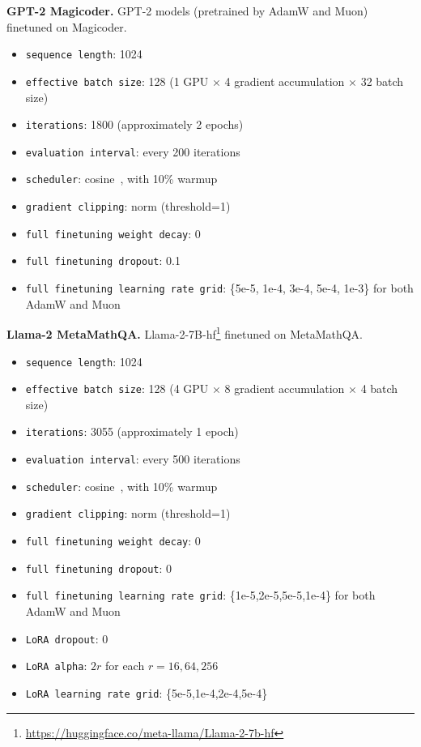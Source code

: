 \documentclass{article}
\theoremstyle{remark}
\begin{document}
\textbf{GPT-2 Magicoder.} GPT-2 models (pretrained by AdamW and Muon) finetuned on Magicoder.
\begin{itemize}
    \item \texttt{sequence length}: 1024
    \item \texttt{effective batch size}: 128 (1 GPU $\times$ 4 gradient accumulation $\times$ 32 batch size)
    \item \texttt{iterations}: 1800 (approximately 2 epochs)
    \item \texttt{evaluation interval}: every 200 iterations
    \item \texttt{scheduler}: cosine~\citep{loshchilov2016sgdr}, with 10\% warmup
    \item \texttt{gradient clipping}: norm (threshold=1)
    \item \texttt{full finetuning weight decay}: 0
    \item \texttt{full finetuning dropout}: 0.1
    \item \texttt{full finetuning learning rate grid}: \{5e-5, 1e-4, 3e-4, 5e-4, 1e-3\} for both AdamW and Muon
\end{itemize}

\textbf{Llama-2 MetaMathQA.} Llama-2-7B-hf\footnote{\url{https://huggingface.co/meta-llama/Llama-2-7b-hf}} finetuned on MetaMathQA.
\begin{itemize}
    \item \texttt{sequence length}: 1024
    \item \texttt{effective batch size}: 128 (4 GPU $\times$ 8 gradient accumulation $\times$ 4 batch size)
    \item \texttt{iterations}: 3055 (approximately 1 epoch)
    \item \texttt{evaluation interval}: every 500 iterations
    \item \texttt{scheduler}: cosine~\citep{loshchilov2016sgdr}, with 10\% warmup
    \item \texttt{gradient clipping}: norm (threshold=1)
    \item \texttt{full finetuning weight decay}: 0
    \item \texttt{full finetuning dropout}: 0
    \item \texttt{full finetuning learning rate grid}: \{1e-5,2e-5,5e-5,1e-4\} for both AdamW and Muon
    \item \texttt{LoRA dropout}: 0
    \item \texttt{LoRA alpha}: $2r$ for each $r=16,64,256$
    \item \texttt{LoRA learning rate grid}: \{5e-5,1e-4,2e-4,5e-4\}
\end{itemize}
\end{document}
